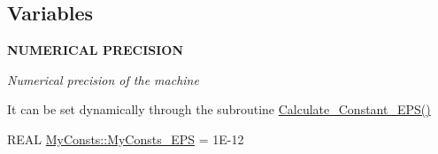 \subsection*{Variables}
\begin{Indent}{\bf NUMERICAL PRECISION}\par
{\em \label{_amgrp06d6057c95b18103ce7db924b914f0ce}
Numerical precision of the machine \par
 It can be set dynamically through the subroutine \hyperlink{namespace_my_consts_a30010b124d6326386412e65f9673b934}{Calculate\_\-Constant\_\-EPS()} }\begin{DoxyCompactItemize}
\item 
REAL \hyperlink{namespace_my_consts_a16f360c5da46572d6fb585806a1df519}{MyConsts::MyConsts\_\-EPS} = 1E-\/12
\end{DoxyCompactItemize}
\end{Indent}
